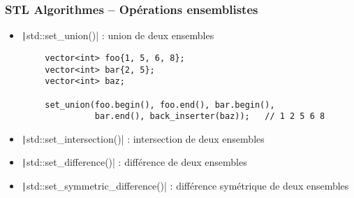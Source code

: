 \documentclass[C++.tex]{subfiles}
\begin{document}
\begin{frame}[fragile]
	\frametitle{STL Algorithmes -- Opérations ensemblistes}
	\begin{itemize}
		\item \texttt|std::set_union()| : union de deux ensembles
	\end{itemize}

	\begin{verbatim}
		vector<int> foo{1, 5, 6, 8};
		vector<int> bar{2, 5};
		vector<int> baz;

		set_union(foo.begin(), foo.end(), bar.begin(),
		          bar.end(), back_inserter(baz));   // 1 2 5 6 8
	\end{verbatim}

	\begin{itemize}
		\item \texttt|std::set_intersection()| : intersection de deux ensembles
		\item \texttt|std::set_difference()| : différence de deux ensembles
		\item \texttt|std::set_symmetric_difference()| : différence symétrique de deux ensembles

	\end{itemize}


\end{frame}
\end{document}
